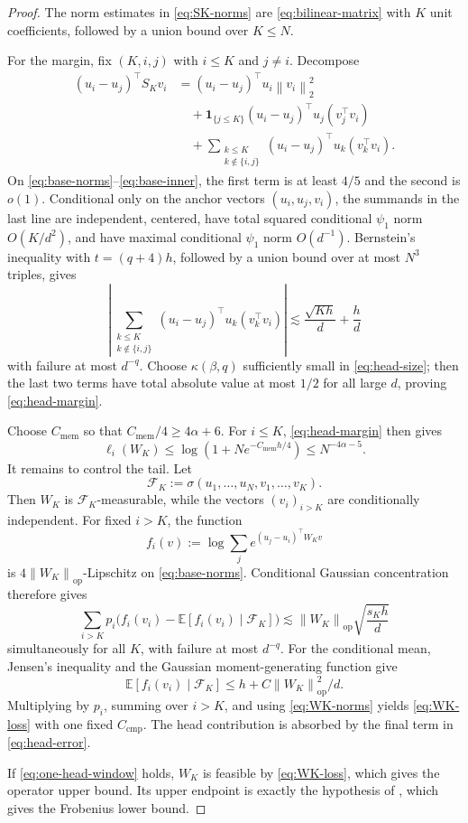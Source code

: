 \documentclass[11pt]{article}
\theoremstyle{definition}
\newcommand{\Ee}{\mathbb E}
\newcommand{\norm}[1]{\left\lVert #1\right\rVert_2}
\newcommand{\normop}[1]{\left\lVert #1\right\rVert_{\mathrm{op}}}
\begin{document}
\begin{proof}
The norm estimates in \eqref{eq:SK-norms} are
\eqref{eq:bilinear-matrix} with $K$ unit coefficients, followed by a
union bound over $K\leq N$.

For the margin, fix $(K,i,j)$ with $i\leq K$ and $j\neq i$.  Decompose
\begin{align*}
 (u_i-u_j)^\top S_Kv_i
 &= (u_i-u_j)^\top u_i\norm{v_i}^2\\
 &\quad+\mathbf1_{\{j\leq K\}}
 (u_i-u_j)^\top u_j(v_j^\top v_i)\\
 &\quad+\sum_{\substack{k\leq K\\k\notin\{i,j\}}}
 (u_i-u_j)^\top u_k(v_k^\top v_i).
\end{align*}
On \eqref{eq:base-norms}--\eqref{eq:base-inner}, the first term is at
least $4/5$ and the second is $o(1)$.  Conditional only on the anchor
vectors $(u_i,u_j,v_i)$, the summands in the last line are independent,
centered, have total squared conditional $\psi_1$ norm $O(K/d^2)$,
and have maximal conditional $\psi_1$ norm $O(d^{-1})$.  Bernstein's inequality
with $t=(q+4)h$, followed by a union bound over at most $N^3$ triples,
gives
\[
 \left|\sum_{\substack{k\leq K\\k\notin\{i,j\}}}
 (u_i-u_j)^\top u_k(v_k^\top v_i)\right|
 \lesssim \frac{\sqrt{Kh}}d+\frac hd
\]
with failure at most $d^{-q}$.  Choose $\kappa(\beta,q)$ sufficiently
small in \eqref{eq:head-size}; then the last two terms have total
absolute value at most $1/2$ for all large $d$, proving
\eqref{eq:head-margin}.

Choose $C_{\mathrm{mem}}$ so that
$C_{\mathrm{mem}}/4\geq4\alpha+6$.  For $i\leq K$,
\eqref{eq:head-margin} then gives
\[
 \ell_i(W_K)\leq
 \log(1+Ne^{-C_{\mathrm{mem}}h/4})
 \leq N^{-4\alpha-5}.
\]
It remains to control the tail.  Let
\[
 \mathcal F_K:=\sigma(u_1,\ldots,u_N,v_1,\ldots,v_K).
\]
Then $W_K$ is $\mathcal F_K$-measurable, while the vectors
$(v_i)_{i>K}$ are conditionally independent.  For fixed $i>K$, the
function
\[
 f_i(v):=\log\sum_j e^{(u_j-u_i)^\top W_Kv}
\]
is $4\normop{W_K}$-Lipschitz on \eqref{eq:base-norms}.  Conditional
Gaussian concentration therefore gives
\[
 \sum_{i>K}p_i\bigl(f_i(v_i)-\Ee[f_i(v_i)\mid\mathcal F_K]\bigr)
 \lesssim \normop{W_K}\sqrt{\frac{s_Kh}{d}}
\]
simultaneously for all $K$, with failure at most $d^{-q}$.  For the
conditional mean, Jensen's inequality and the Gaussian moment-generating
function give
\[
 \Ee[f_i(v_i)\mid\mathcal F_K]
 \leq h+C\normop{W_K}^2/d.
\]
Multiplying by $p_i$, summing over $i>K$, and using
\eqref{eq:WK-norms} yields \eqref{eq:WK-loss} with one fixed
$C_{\mathrm{cmp}}$.  The head contribution is absorbed by the final
term in \eqref{eq:head-error}.

If \eqref{eq:one-head-window} holds, $W_K$ is feasible by
\eqref{eq:WK-loss}, which gives the operator upper bound.  Its upper
endpoint is exactly the hypothesis of , which gives the
Frobenius lower bound.
\end{proof}
\end{document}
